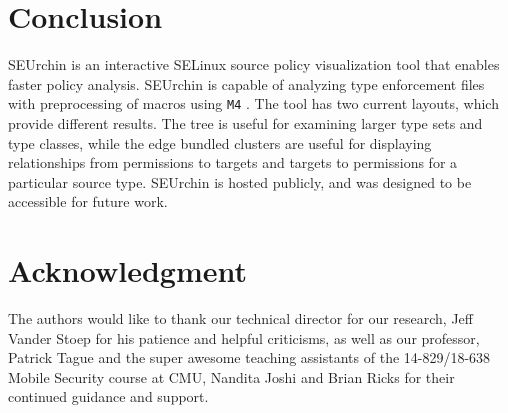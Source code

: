 \documentclass[conference]{IEEEtran}
\begin{document}



\section{Conclusion}\label{sec:conclusion}
SEUrchin is an interactive SELinux source policy visualization tool that enables faster policy analysis. SEUrchin is capable of analyzing type enforcement files with preprocessing of macros using \texttt{M4} \cite{m4}. The tool has two current layouts, which provide different results. The tree is useful for examining larger type sets and type classes, while the edge bundled clusters are useful for displaying relationships from permissions to targets and targets to permissions for a particular source type. SEUrchin is hosted publicly, and was designed to be accessible for future work.





\section*{Acknowledgment}\label{sec:ack}

The authors would like to thank our technical director for our research, Jeff Vander Stoep for his patience and helpful criticisms, as well as our professor, Patrick Tague and the super awesome teaching assistants of the 14-829/18-638 Mobile Security course at CMU, Nandita Joshi and Brian Ricks for their continued guidance and support. 




\end{document}
